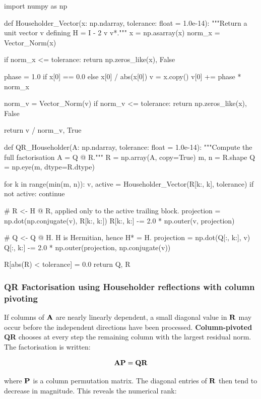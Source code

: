 \begin{python}
import numpy as np


def Householder_Vector(x: np.ndarray,
                       tolerance: float = 1.0e-14):
    """Return a unit vector v defining H = I - 2 v v*."""
    x = np.asarray(x)
    norm_x = Vector_Norm(x)

    if norm_x <= tolerance:
        return np.zeros_like(x), False

    phase = 1.0 if x[0] == 0.0 else x[0] / abs(x[0])
    v = x.copy()
    v[0] += phase * norm_x

    norm_v = Vector_Norm(v)
    if norm_v <= tolerance:
        return np.zeros_like(x), False

    return v / norm_v, True


def QR_Householder(A: np.ndarray,
                   tolerance: float = 1.0e-14):
    """Compute the full factorisation A = Q @ R."""
    R = np.array(A, copy=True)
    m, n = R.shape
    Q = np.eye(m, dtype=R.dtype)

    for k in range(min(m, n)):
        v, active = Householder_Vector(R[k:, k], tolerance)
        if not active:
            continue

        # R <- H @ R, applied only to the active trailing block.
        projection = np.dot(np.conjugate(v), R[k:, k:])
        R[k:, k:] -= 2.0 * np.outer(v, projection)

        # Q <- Q @ H. H is Hermitian, hence H* = H.
        projection = np.dot(Q[:, k:], v)
        Q[:, k:] -= 2.0 * np.outer(projection, np.conjugate(v))

    R[abs(R) < tolerance] = 0.0
    return Q, R
\end{python}

\subsubsection{QR Factorisation using Householder reflections with column pivoting}

If columns of $ \mathbf{A} $ are nearly linearly dependent, a small diagonal value in
$ \mathbf{R} $ may occur before the independent directions have been processed.
\textbf{Column-pivoted QR} chooses at every step the remaining column with the
largest residual norm. The factorisation is written:

\begin{equation}
    \mathbf{A}\mathbf{P}=\mathbf{Q}\mathbf{R}
\end{equation}

where $ \mathbf{P} $ is a column permutation matrix. The diagonal entries of
$ \mathbf{R} $ then tend to decrease in magnitude. This reveals the numerical rank:

